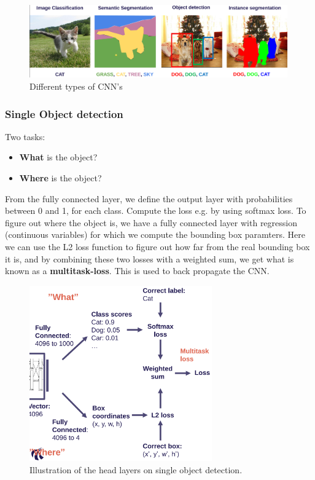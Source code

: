 \documentclass[a4paper]{article}
\begin{document}
\begin{figure}[H]
\centering
\includegraphics[width=0.99\textwidth]{figures/Types_of_CNN.png}
\caption{Different types of CNN's}
\label{fig:cnn_types}
\end{figure} 


\subsubsection*{Single Object detection}
Two tasks:
\begin{itemize}
	\item \textbf{What} is the object? 
	\item \textbf{Where} is the object? 
\end{itemize}

From the fully connected layer, we define the output layer with probabilities between 0 and 1, for each class. Compute the loss e.g. by using softmax loss. To figure out where the object is, we have a fully connected layer with regression (continuous variables) for which we compute the bounding box paramters. Here we can use the L2 loss function to figure out how far from the real bounding box it is, and by combining these two losses with a weighted sum, we get what is known as a \textbf{multitask-loss}. This is used to back propagate the CNN. 

\begin{figure}[H]
\centering
\includegraphics[width=0.7\textwidth]{figures/Single_object_detection.png}
\caption{Illustration of the head layers on single object detection.}
\label{fig:single_object_detection}
\end{figure} 
\end{document}
